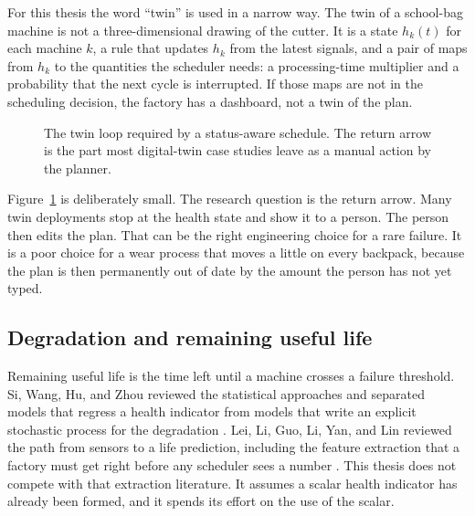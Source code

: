 For this thesis the word ``twin'' is used in a narrow way. The twin of a school-bag machine is not a three-dimensional drawing of the cutter. It is a state \(h_k(t)\) for each machine \(k\), a rule that updates \(h_k\) from the latest signals, and a pair of maps from \(h_k\) to the quantities the scheduler needs: a processing-time multiplier and a probability that the next cycle is interrupted. If those maps are not in the scheduling decision, the factory has a dashboard, not a twin of the plan.

\begin{figure}[ht]
\centering
{}
\caption{The twin loop required by a status-aware schedule. The return arrow is the part most digital-twin case studies leave as a manual action by the planner.}
\label{fig:twin-loop}
\end{figure}

Figure~\ref{fig:twin-loop} is deliberately small. The research question is the return arrow. Many twin deployments stop at the health state and show it to a person. The person then edits the plan. That can be the right engineering choice for a rare failure. It is a poor choice for a wear process that moves a little on every backpack, because the plan is then permanently out of date by the amount the person has not yet typed.

\subsection{Degradation and remaining useful life}

Remaining useful life is the time left until a machine crosses a failure threshold. Si, Wang, Hu, and Zhou reviewed the statistical approaches and separated models that regress a health indicator from models that write an explicit stochastic process for the degradation \cite{si2011}. Lei, Li, Guo, Li, Yan, and Lin reviewed the path from sensors to a life prediction, including the feature extraction that a factory must get right before any scheduler sees a number \cite{lei2018}. This thesis does not compete with that extraction literature. It assumes a scalar health indicator has already been formed, and it spends its effort on the use of the scalar.

